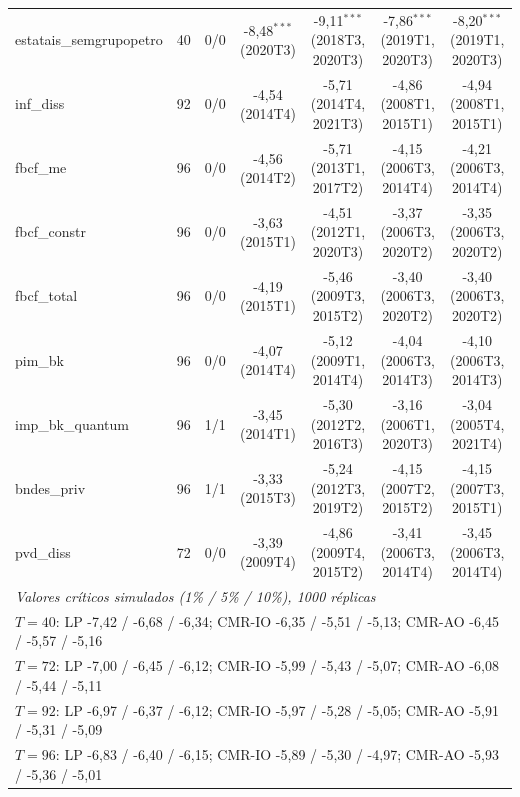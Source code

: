 \begin{table}[htbp]
\begin{tabular}{lcccccc}
estatais\_semgrupopetro & 40 & 0/0 & -8{,}48$^{***}$ (2020T3) & -9{,}11$^{***}$ (2018T3, 2020T3) & -7{,}86$^{***}$ (2019T1, 2020T3) & -8{,}20$^{***}$ (2019T1, 2020T3) \\
inf\_diss & 92 & 0/0 & -4{,}54 (2014T4) & -5{,}71 (2014T4, 2021T3) & -4{,}86 (2008T1, 2015T1) & -4{,}94 (2008T1, 2015T1) \\
fbcf\_me & 96 & 0/0 & -4{,}56 (2014T2) & -5{,}71 (2013T1, 2017T2) & -4{,}15 (2006T3, 2014T4) & -4{,}21 (2006T3, 2014T4) \\
fbcf\_constr & 96 & 0/0 & -3{,}63 (2015T1) & -4{,}51 (2012T1, 2020T3) & -3{,}37 (2006T3, 2020T2) & -3{,}35 (2006T3, 2020T2) \\
fbcf\_total & 96 & 0/0 & -4{,}19 (2015T1) & -5{,}46 (2009T3, 2015T2) & -3{,}40 (2006T3, 2020T2) & -3{,}40 (2006T3, 2020T2) \\
pim\_bk & 96 & 0/0 & -4{,}07 (2014T4) & -5{,}12 (2009T1, 2014T4) & -4{,}04 (2006T3, 2014T3) & -4{,}10 (2006T3, 2014T3) \\
imp\_bk\_quantum & 96 & 1/1 & -3{,}45 (2014T1) & -5{,}30 (2012T2, 2016T3) & -3{,}16 (2006T1, 2020T3) & -3{,}04 (2005T4, 2021T4) \\
bndes\_priv & 96 & 1/1 & -3{,}33 (2015T3) & -5{,}24 (2012T3, 2019T2) & -4{,}15 (2007T2, 2015T2) & -4{,}15 (2007T3, 2015T1) \\
pvd\_diss & 72 & 0/0 & -3{,}39 (2009T4) & -4{,}86 (2009T4, 2015T2) & -3{,}41 (2006T3, 2014T4) & -3{,}45 (2006T3, 2014T4) \\
\midrule
\multicolumn{7}{l}{\textit{Valores cr\'iticos simulados (1\% / 5\% / 10\%), 1000 r\'eplicas}} \\
\multicolumn{7}{l}{$T = 40$: LP -7{,}42 / -6{,}68 / -6{,}34; CMR-IO -6{,}35 / -5{,}51 / -5{,}13; CMR-AO -6{,}45 / -5{,}57 / -5{,}16} \\
\multicolumn{7}{l}{$T = 72$: LP -7{,}00 / -6{,}45 / -6{,}12; CMR-IO -5{,}99 / -5{,}43 / -5{,}07; CMR-AO -6{,}08 / -5{,}44 / -5{,}11} \\
\multicolumn{7}{l}{$T = 92$: LP -6{,}97 / -6{,}37 / -6{,}12; CMR-IO -5{,}97 / -5{,}28 / -5{,}05; CMR-AO -5{,}91 / -5{,}31 / -5{,}09} \\
\multicolumn{7}{l}{$T = 96$: LP -6{,}83 / -6{,}40 / -6{,}15; CMR-IO -5{,}89 / -5{,}30 / -4{,}97; CMR-AO -5{,}93 / -5{,}36 / -5{,}01} \\
\bottomrule
\end{tabular}
\begin{minipage}{0.97\linewidth}\footnotesize

\end{minipage}
\end{table}
